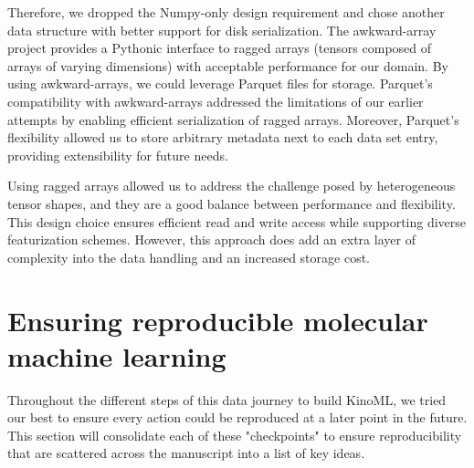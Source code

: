 \documentclass[9pt,lessons]{livecoms}
\begin{document}
Therefore, we dropped the Numpy-only design requirement and chose another data structure with better support for disk serialization. The awkward-array project provides a Pythonic interface to ragged arrays (tensors composed of arrays of varying dimensions) with acceptable performance for our domain. By using awkward-arrays, we could leverage Parquet files for storage. Parquet's compatibility with awkward-arrays addressed the limitations of our earlier attempts by enabling efficient serialization of ragged arrays. Moreover, Parquet's flexibility allowed us to store arbitrary metadata next to each data set entry, providing extensibility for future needs.

Using ragged arrays allowed us to address the challenge posed by heterogeneous tensor shapes, and they are a good balance between performance and flexibility. This design choice ensures efficient read and write access while supporting diverse featurization schemes. However, this approach does add an extra layer of complexity into the data handling and an increased storage cost.



\section{Ensuring reproducible molecular machine learning}

Throughout the different steps of this data journey to build KinoML, we tried our best to ensure every action could be reproduced at a later point in the future. This section will consolidate each of these "checkpoints" to ensure reproducibility that are scattered across the manuscript into a list of key ideas.
\end{document}
